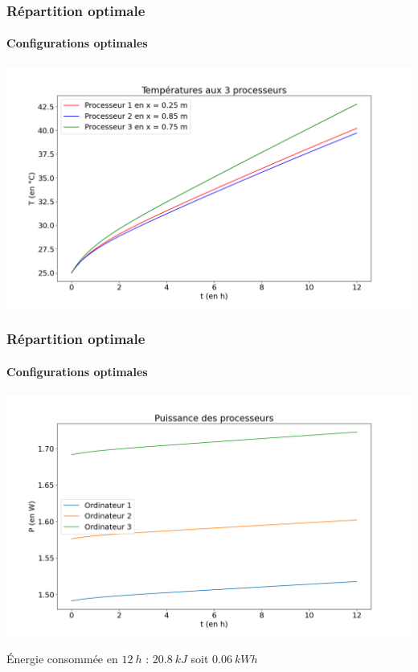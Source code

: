\documentclass[a4paper,11pt]{beamer}
\begin{document}
\begin{frame}
    \frametitle{Répartition optimale}
    \framesubtitle{Configurations optimales}

    \includegraphics[width=\textwidth]{min_temperature.png}
\end{frame}

\begin{frame}
    \frametitle{Répartition optimale}
    \framesubtitle{Configurations optimales}

    \includegraphics[width=\textwidth]{min_puissance.png}

    \begin{center}
        Énergie consommée en $\SI{12}{h}$ : $\SI{20,8}{kJ}$ soit $\SI{0.06}{kWh}$
    \end{center}
\end{frame}
\end{document}
